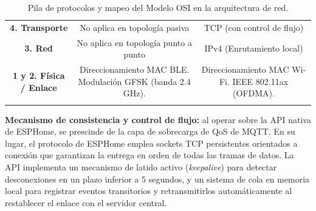 \begin{table}[H]
\begin{tabular}{|c|c|c|}
        \parbox[c]{3.5cm}{\vspace{0.2cm}\centering\textbf{4. Transporte}\vspace{0.2cm}} & \parbox[c]{5.25cm}{\vspace{0.2cm}\centering No aplica en topología pasiva\vspace{0.2cm}} & \parbox[c]{5.25cm}{\vspace{0.2cm}\centering TCP (con control de flujo)\vspace{0.2cm}} \\ \hhline{|-|-|-|}
        \parbox[c]{3.5cm}{\vspace{0.2cm}\centering\textbf{3. Red}\vspace{0.2cm}} & \parbox[c]{5.25cm}{\vspace{0.2cm}\centering No aplica en topología punto a punto\vspace{0.2cm}} & \parbox[c]{5.25cm}{\vspace{0.2cm}\centering IPv4 (Enrutamiento local)\vspace{0.2cm}} \\ \hhline{|-|-|-|}
        \parbox[c]{3.5cm}{\vspace{0.2cm}\centering\textbf{1 y 2. Física / Enlace}\vspace{0.2cm}} & \parbox[c]{5.25cm}{\vspace{0.2cm}\centering Direccionamiento MAC BLE. Modulación GFSK (banda 2.4 GHz).\vspace{0.2cm}} & \parbox[c]{5.25cm}{\vspace{0.2cm}\centering Direccionamiento MAC Wi-Fi. IEEE 802.11ax (OFDMA).\vspace{0.2cm}} \\ \hhline{|-|-|-|}
    \end{tabular}
    \caption{Pila de protocolos y mapeo del Modelo OSI en la arquitectura de red.}
    \label{tab:protocolos_osi}
\end{table}

\textbf{Mecanismo de consistencia y control de flujo:}
al operar sobre la API nativa de ESPHome, se prescinde de la capa de sobrecarga de QoS de MQTT. En su lugar, el protocolo de ESPHome emplea sockets TCP persistentes orientados a conexión que garantizan la entrega en orden de todas las tramas de datos. La API implementa un mecanismo de latido activo (\textit{keepalive}) para detectar desconexiones en un plazo inferior a 5 segundos, y un sistema de cola en memoria local para registrar eventos transitorios y retransmitirlos automáticamente al restablecer el enlace con el servidor central.

